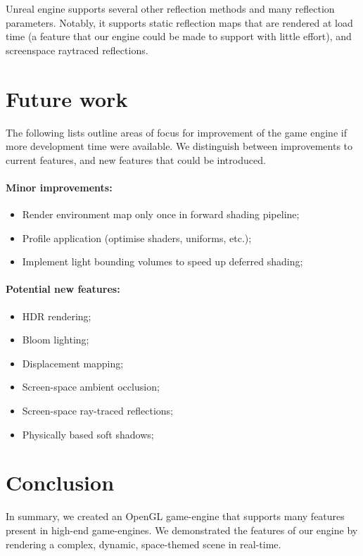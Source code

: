 \documentclass[11pt]{scrartcl} %
\begin{document}
        Unreal engine supports several other reflection methods and many
        reflection parameters. Notably, it supports static reflection maps that
        are rendered at load time (a feature that our engine could be made to
        support with little effort), and screenspace raytraced reflections.

\section{Future work}

    The following lists outline areas of focus for improvement of the game
    engine if more development time were available. We distinguish between
    improvements to current features, and new features that could be
    introduced.

    \paragraph{Minor improvements:}
    \begin{itemize}
        \item Render environment map only once in forward shading pipeline;
        \item Profile application (optimise shaders, uniforms, etc.);
        \item Implement light bounding volumes to speed up deferred shading;
    \end{itemize}

    \paragraph{Potential new features:}
    \begin{itemize}
        \item HDR rendering;
        \item Bloom lighting;
        \item Displacement mapping;
        \item Screen-space ambient occlusion;
        \item Screen-space ray-traced reflections;
        \item Physically based soft shadows;
    \end{itemize}


\section{Conclusion}

    In summary, we created an OpenGL game-engine that supports many features
    present in high-end game-engines. We demonstrated the features of our
    engine by rendering a complex, dynamic, space-themed scene in real-time.
\end{document}
